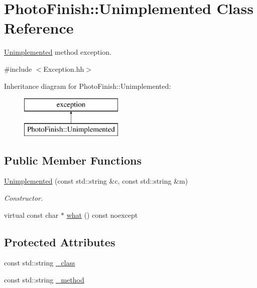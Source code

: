 \hypertarget{class_photo_finish_1_1_unimplemented}{}\section{Photo\+Finish\+:\+:Unimplemented Class Reference}
\label{class_photo_finish_1_1_unimplemented}


\hyperlink{class_photo_finish_1_1_unimplemented}{Unimplemented} method exception.  




{\ttfamily \#include $<$Exception.\+hh$>$}

Inheritance diagram for Photo\+Finish\+:\+:Unimplemented\+:\begin{figure}[H]
\begin{center}
\leavevmode
\includegraphics[height=2.000000cm]{class_photo_finish_1_1_unimplemented}
\end{center}
\end{figure}
\subsection*{Public Member Functions}
\begin{DoxyCompactItemize}
\item 
\hyperlink{class_photo_finish_1_1_unimplemented_ac1b14d17ed2585ed91d51b54defa190c}{Unimplemented} (const std\+::string \&c, const std\+::string \&m)
\begin{DoxyCompactList}\small\item\em Constructor. \end{DoxyCompactList}\item 
virtual const char $\ast$ \hyperlink{class_photo_finish_1_1_unimplemented_a7fd6d687bffc73a91b289c3e7cf76170}{what} () const noexcept
\end{DoxyCompactItemize}
\subsection*{Protected Attributes}
\begin{DoxyCompactItemize}
\item 
const std\+::string \hyperlink{class_photo_finish_1_1_unimplemented_aecf1e72e18a877c34af703714c8a4f01}{\+\_\+class}
\item 
const std\+::string \hyperlink{class_photo_finish_1_1_unimplemented_a625e70a81660e6b321dca2c782d42e87}{\+\_\+method}
\end{DoxyCompactItemize}


